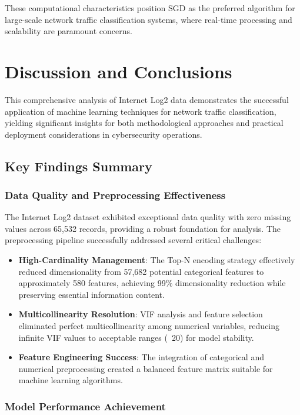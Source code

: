 \documentclass[12pt,a4paper]{article}
\begin{document}
These computational characteristics position SGD as the preferred algorithm for large-scale network traffic classification systems, where real-time processing and scalability are paramount concerns.

\section{Discussion and Conclusions}

This comprehensive analysis of Internet Log2 data demonstrates the successful application of machine learning techniques for network traffic classification, yielding significant insights for both methodological approaches and practical deployment considerations in cybersecurity operations.

\subsection{Key Findings Summary}

\subsubsection{Data Quality and Preprocessing Effectiveness}

The Internet Log2 dataset exhibited exceptional data quality with zero missing values across 65,532 records, providing a robust foundation for analysis. The preprocessing pipeline successfully addressed several critical challenges:

\begin{itemize}
    \item \textbf{High-Cardinality Management}: The Top-N encoding strategy effectively reduced dimensionality from 57,682 potential categorical features to approximately 580 features, achieving 99\% dimensionality reduction while preserving essential information content.
    \item \textbf{Multicollinearity Resolution}: VIF analysis and feature selection eliminated perfect multicollinearity among numerical variables, reducing infinite VIF values to acceptable ranges (~20) for model stability.
    \item \textbf{Feature Engineering Success}: The integration of categorical and numerical preprocessing created a balanced feature matrix suitable for machine learning algorithms.
\end{itemize}

\subsubsection{Model Performance Achievement}
\end{document}
